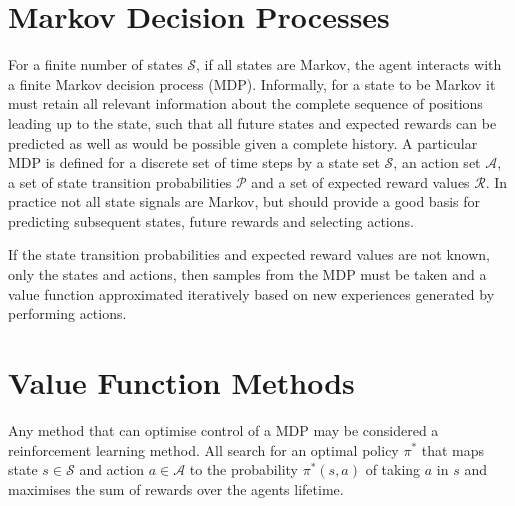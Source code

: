 

\section{Markov Decision Processes}
For a finite number of states $\mathscr{S}$, if all states are Markov, the
agent interacts with a finite Markov decision process (MDP).  Informally,
for a state to be Markov it must retain all relevant information about the
complete sequence of positions leading up to the state, such that all future
states and expected rewards can be predicted as well as would be possible given
a complete history.  A particular MDP is defined for a discrete set of time
steps by a state set $\mathscr{S}$, an action set $\mathscr{A}$, a set of state
transition probabilities $\mathscr{P}$ and a set of expected reward values
$\mathscr{R}$.
In practice not all state signals are Markov, but should provide a good basis
for predicting subsequent states, future rewards and selecting actions.

If the state transition probabilities and expected reward values are not known,
only the states and actions, then samples from the MDP must be taken and a value
function approximated iteratively based on new experiences generated by
performing actions.

\section{Value Function Methods}
\label{sec:valuebased}
Any method that can optimise control of a MDP may be considered a reinforcement
learning method.  All search for an optimal policy $\pi^*$ that maps state
$s \in \mathscr{S}$ and action $a \in \mathscr{A}$ to the probability
$\pi^*(s,a)$ of taking $a$ in $s$ and maximises the sum of rewards over the
agents lifetime.

